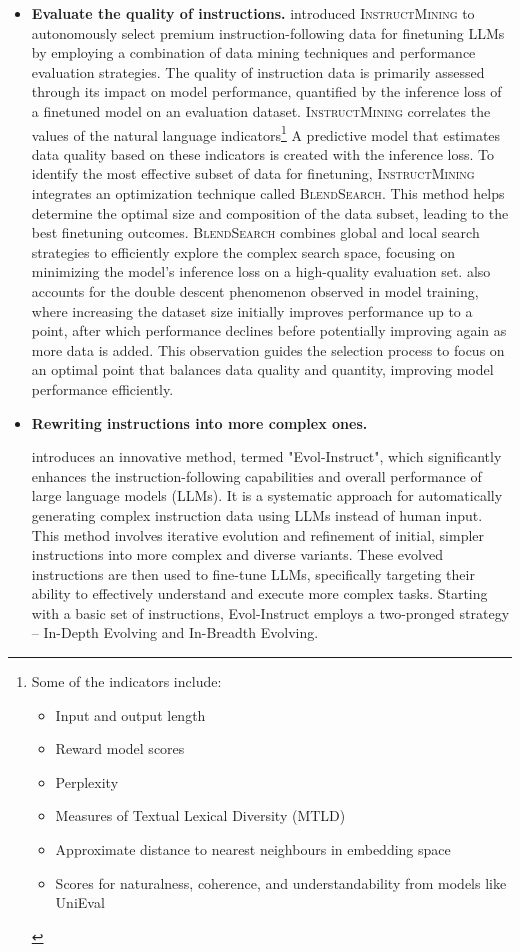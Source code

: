 \begin{itemize}
{	      }
	\item \textbf{Evaluate the quality of instructions.}{
		      \textcite{cao2023instruction} introduced \textsc{InstructMining} to autonomously select premium instruction-following data for finetuning LLMs by employing a combination of data mining techniques and performance evaluation strategies.
		      The quality of instruction data is primarily assessed through its impact on model performance, quantified by the inference loss of a finetuned model on an evaluation dataset. \textsc{InstructMining} correlates the values of the natural language indicators\footnote{Some of the indicators include:
			      \begin{itemize}
				      \item Input and output length
				      \item Reward model scores
				      \item Perplexity
				      \item Measures of Textual Lexical Diversity (MTLD)
				      \item Approximate distance to nearest neighbours in embedding space
				      \item Scores for naturalness, coherence, and understandability from models like UniEval
			      \end{itemize}
		      }
		      A predictive model that estimates data quality based on these indicators is created with the inference loss.
		      To identify the most effective subset of data for finetuning, \textsc{InstructMining} integrates an optimization technique called \textsc{BlendSearch}. This method helps determine the optimal size and composition of the data subset, leading to the best finetuning outcomes. \textsc{BlendSearch} combines global and local search strategies to efficiently explore the complex search space, focusing on minimizing the model’s inference loss on a high-quality evaluation set.
		      \textcite{cao2023instruction} also accounts for the double descent phenomenon observed in model training, where increasing the dataset size initially improves performance up to a point, after which performance declines before potentially improving again as more data is added. This observation guides the selection process to focus on an optimal point that balances data quality and quantity, improving model performance efficiently.
	      }
	\item \textbf{Rewriting instructions into more complex ones.} {
		      \textcite{xu2023wizardlm} introduces an innovative method, termed "Evol-Instruct", which significantly enhances the instruction-following capabilities and overall performance of large language models (LLMs). It is a systematic approach for automatically generating complex instruction data using LLMs instead of human input. This method involves iterative evolution and refinement of initial, simpler instructions into more complex and diverse variants. These evolved instructions are then used to fine-tune LLMs, specifically targeting their ability to effectively understand and execute more complex tasks. Starting with a basic set of instructions, Evol-Instruct employs a two-pronged strategy -- In-Depth Evolving and In-Breadth Evolving.

}
\end{itemize}
